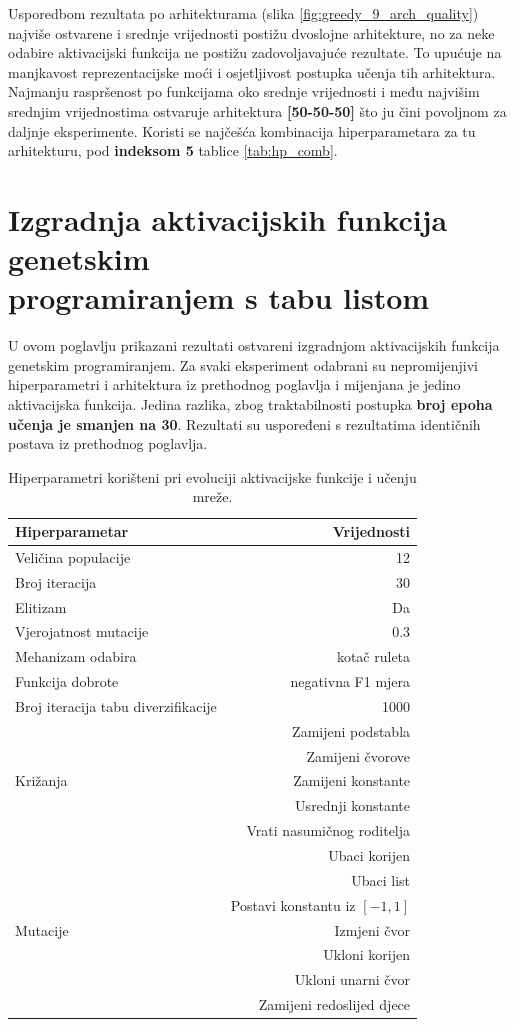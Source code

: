\documentclass[times, utf8, numeric, diplomski]{fer}
\def\figref#1{(slika \ref{#1})}
\begin{document}
Usporedbom rezultata po arhitekturama \figref{fig:greedy_9_arch_quality} najviše ostvarene i srednje vrijednosti postižu dvoslojne arhitekture, no za neke odabire aktivacijski funkcija ne postižu zadovoljavajuće rezultate. To upućuje na manjkavost reprezentacijske moći i osjetljivost postupka učenja tih arhitektura. Najmanju raspršenost po funkcijama oko srednje vrijednosti i među najvišim srednjim vrijednostima ostvaruje arhitektura \textbf{[50-50-50]} što ju čini povoljnom za daljnje eksperimente. Koristi se najčešća kombinacija hiperparametara za tu arhitekturu, pod \textbf{indeksom 5} tablice \ref{tab:hp_comb}.

\clearpage

\section{Izgradnja aktivacijskih funkcija genetskim \\ programiranjem s tabu listom}
U ovom poglavlju prikazani rezultati ostvareni izgradnjom aktivacijskih funkcija genetskim programiranjem. Za svaki eksperiment odabrani su nepromijenjivi hiperparametri i arhitektura iz prethodnog poglavlja i mijenjana je jedino aktivacijska funkcija. Jedina razlika, zbog traktabilnosti postupka \textbf{broj epoha učenja je smanjen na 30}. Rezultati su uspoređeni s rezultatima identičnih postava iz prethodnog poglavlja. 

\begin{table}[H]
\centering
\begin{tabular}{lr}
Hiperparametar & Vrijednosti \\
\hline
Veličina populacije & 12 \\
Broj iteracija & 30 \\
Elitizam & Da \\
Vjerojatnost mutacije & 0.3 \\
Mehanizam odabira & kotač ruleta \\
Funkcija dobrote & negativna F1 mjera \\
Broj iteracija tabu diverzifikacije & 1000 \\
\hline
\multirow{5}{*}{Križanja}
& Zamijeni podstabla \\
& Zamijeni čvorove \\
& Zamijeni konstante \\
& Usrednji konstante \\
& Vrati nasumičnog roditelja \\
\hline
\multirow{7}{*}{Mutacije}
& Ubaci korijen \\
& Ubaci list \\
& Postavi konstantu iz $[-1,1]$ \\
& Izmjeni čvor \\
& Ukloni korijen \\
& Ukloni unarni čvor \\
& Zamijeni redoslijed djece \\
\end{tabular}
\caption{Hiperparametri korišteni pri evoluciji aktivacijske funkcije i učenju mreže.}
\label{tab:hp_common}
\end{table}
\end{document}
